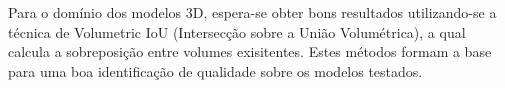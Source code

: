Para o domínio dos modelos 3D, espera-se obter bons resultados utilizando-se a técnica de Volumetric IoU (Intersecção sobre a União Volumétrica), a qual calcula a sobreposição entre volumes exisitentes. Estes métodos formam a base para uma boa identificação  de qualidade sobre os modelos testados.

%
%
%    

